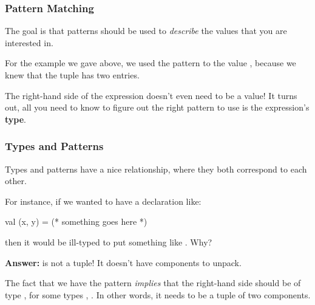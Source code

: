 \documentclass[aspectratio=169, handout]{beamer}
\begin{document}
\begin{frame}[fragile]
  \frametitle{Pattern Matching}


  \pause
  \vspace{5pt}

  The goal is that patterns should be used to \textit{describe} the values that you are interested
  in.

  \pause
  \vspace{\fill}

  For the example we gave above, we used the pattern  to 
  the value , because we knew that the tuple  has two entries.

  \pause
  \vspace{\fill}

  The right-hand side of the expression doesn't even need to be a value! It turns out,
  all you need to know to figure out the right pattern to use is the expression's
  \textbf{type}.
\end{frame}

\begin{frame}[fragile]
  \frametitle{Types and Patterns}

  \tgs

  Types and patterns have a nice relationship, where they both correspond to each other.

  \pause
  \vspace{\fill}

  For instance, if we wanted to have a declaration like:
  \begin{codeblock}
    val (x, y) = (* something goes here *)
  \end{codeblock}

  then it would be ill-typed to put something like . Why?

  \pause
  \vspace{\fill}

  \textbf{Answer:}  is not a tuple! It doesn't have components to unpack.

  \pause
  \vspace{\fill}

  The fact that we have the pattern  \textit{implies} that the right-hand side
  should be of type , for some types , . In other words,
  it needs to be a tuple of two components.
\end{frame}
\end{document}
